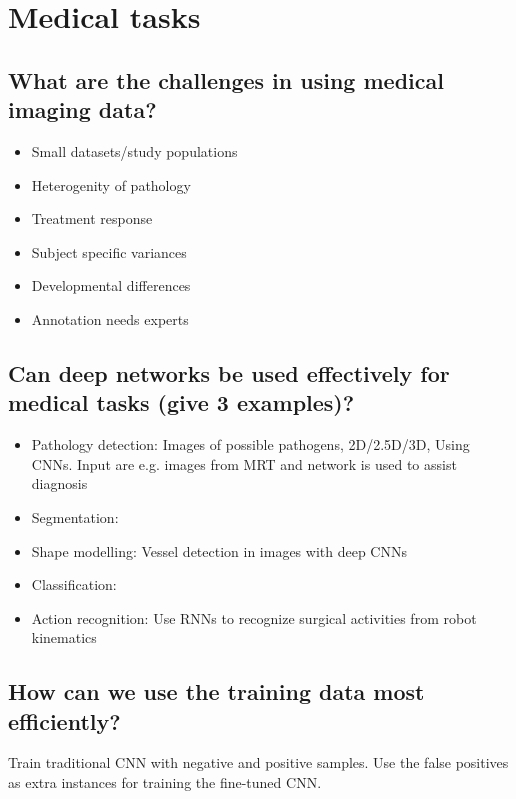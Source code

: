 \section{Medical tasks}
\subsection{What are the challenges in using medical imaging data?}
\begin{itemize}
\item Small datasets/study populations
\item Heterogenity of pathology
\item Treatment response
\item Subject specific variances
\item Developmental differences
\item Annotation needs experts
\end{itemize}
\subsection{Can deep networks be used effectively for medical tasks (give 3 examples)?}
\begin{itemize}
\item Pathology detection: Images of possible pathogens, 2D/2.5D/3D, Using CNNs. Input are e.g. images from MRT and network is used to assist diagnosis
\item Segmentation:
\item Shape modelling: Vessel detection in images with deep CNNs
\item Classification: 
\item Action recognition: Use RNNs to recognize surgical activities from robot kinematics
\end{itemize}
\subsection{How can we use the training data most efficiently?}
Train traditional CNN with negative and positive samples. Use the false positives as extra instances for training the fine-tuned CNN.
